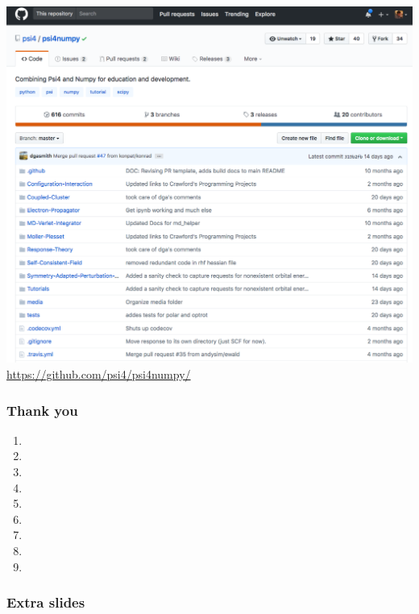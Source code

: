 \documentclass[xcolor=usenames,dvipsnames,svgnames]{beamer}
\begin{document}
\begin{frame}
  \centering
  \includegraphics[scale=0.20]{./figures/psi4numpy_github.png}
  {\scriptsize \url{https://github.com/psi4/psi4numpy/}}
\end{frame}

\begin{frame}
  \frametitle{Thank you}
  \scriptsize
  \begin{enumerate}
  \item {}
  \item {}
  \item {}
  \item {}
  \item {}
  \item {}
  \item {}
  \item {}
  \item {}
  \end{enumerate}
\end{frame}

\appendix

\begin{frame}
  \frametitle{Extra slides}
\end{frame}
\end{document}
